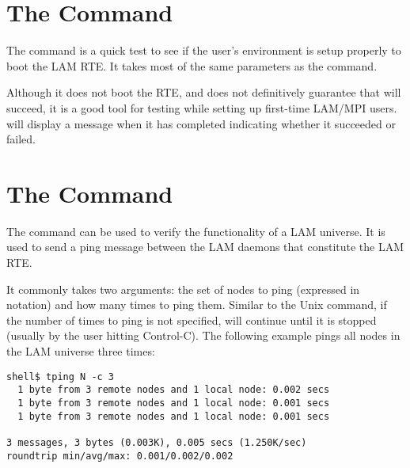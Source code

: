 
\section{The  Command}
\label{sec:commands-recon}

The  command is a quick test to see if the user's
environment is setup properly to boot the LAM RTE.  It takes most of
the same parameters as the  command.

Although it does not boot the RTE, and does not definitively guarantee
that  will succeed, it is a good tool for testing while
setting up first-time LAM/MPI users.   will display a
message when it has completed indicating whether it succeeded or
failed.


\section{The  Command}
\label{sec:commands-tping}

The  command can be used to verify the functionality of a
LAM universe.  It is used to send a ping message between the LAM
daemons that constitute the LAM RTE.  

It commonly takes two arguments: the set of nodes to ping (expressed
in  notation) and how many times to ping them.  Similar to the
Unix  command, if the number of times to ping is not
specified,  will continue until it is stopped (usually by
the user hitting Control-C).  The following example pings all nodes in
the LAM universe three times:

\lstset{style=lam-cmdline}
\begin{lstlisting}
shell$ tping N -c 3
  1 byte from 3 remote nodes and 1 local node: 0.002 secs
  1 byte from 3 remote nodes and 1 local node: 0.001 secs
  1 byte from 3 remote nodes and 1 local node: 0.001 secs

3 messages, 3 bytes (0.003K), 0.005 secs (1.250K/sec)
roundtrip min/avg/max: 0.001/0.002/0.002
\end{lstlisting}

